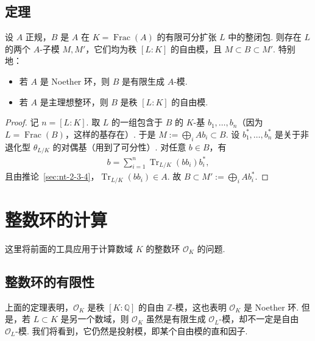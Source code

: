 \subsection{定理}\label{sec:nt-2-4-6}
\begin{theorem*}
设 $A$ 正规，$B$ 是 $A$ 在 $K=\operatorname{Frac}(A)$ 的有限可分扩张 $L$ 中的整闭包. 则存在 $L$ 的两个 $A$-子模 $M,M'$，它们均为秩 $[L:K]$ 的自由模，且 $M\subset B\subset M'$. 特别地：
\begin{itemize}
\item 若 $A$ 是 Noether 环，则 $B$ 是有限生成 $A$-模.
\item 若 $A$ 是主理想整环，则 $B$ 是秩 $[L:K]$ 的自由模.
\end{itemize}
\end{theorem*}
\begin{proof}
记 $n=[L:K]$. 取 $L$ 的一组包含于 $B$ 的 $K$-基 $b_1,\ldots,b_n$（因为 $L=\operatorname{Frac}(B)$，这样的基存在）.
于是 $M:=\bigoplus_iAb_i\subset B$.
设 $b_1^*,\ldots,b_n^*$ 是关于非退化型 $\theta_{L/K}$ 的对偶基（用到了可分性）.
对任意 $b\in B$，有
\begin{align*}
b=\sum_{i=1}^n\operatorname{Tr}_{L/K}(bb_i)b_i^*,
\end{align*}
且由推论~\ref{sec:nt-2-3-4}，$\operatorname{Tr}_{L/K}(bb_i)\in A$.
故 $B\subset M':=\bigoplus_iAb_i^*$.
\end{proof}

\section{整数环的计算}\label{sec:nt-2-5}
这里将前面的工具应用于计算数域 $K$ 的整数环 $\mathcal O_K$ 的问题.

\subsection{整数环的有限性}\label{sec:nt-2-5-1}
上面的定理表明，$\mathcal O_K$ 是秩 $[K:\mathbb Q]$ 的自由 $\mathbb Z$-模，这也表明 $\mathcal O_K$ 是 Noether 环.
但是，若 $L\subset K$ 是另一个数域，则 $\mathcal O_K$ 虽然是有限生成 $\mathcal O_L$-模，却不一定是自由 $\mathcal O_L$-模.
我们将看到，它仍然是投射模，即某个自由模的直和因子.

